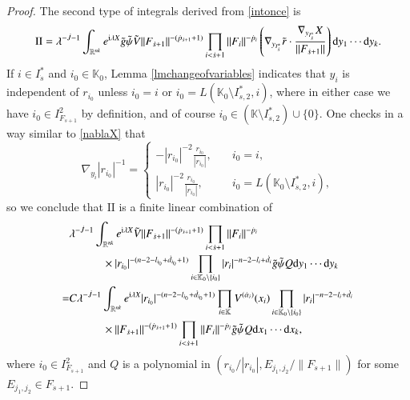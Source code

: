 \documentclass[11pt,reqno]{amsart}
\def\d{{\rm d}}
\numberwithin{equation}{section}
\theoremstyle{definition}
\begin{document}
\begin{proof}
	The second type of integrals derived from \eqref{intonce} is
	\begin{equation*}
		\mathrm{II}=\lambda^{-\dot{J}-1}\int_{\mathbb{R}^{nk}}e^{\mathrm{i}\lambda X}\tilde{g}\tilde{\psi}\tilde{V}\|F_{\dot{s}+1}\|^{-(\dot{p}_{\dot{s}+1}+1)}\prod_{i<\dot{s}+1}\|F_i\|^{-{\dot{p}_i}}\left(\nabla_{y_{I_{\dot{s}}^*}}\tilde{r}\cdot\frac{\nabla_{y_{I_{\dot{s}}^*}}X}{\|F_{\dot{s}+1}\|}\right)\d y_1\cdots \d y_k.
	\end{equation*}
	If $i\in I_{\dot{s}}^*$ and $i_0\in\mathbb{K}_0$, Lemma \ref{lmchangeofvariables} indicates that $y_i$ is independent of $r_{i_0}$ unless $i_0=i$ or $i_0=L(\mathbb{K}_0\setminus I_{\dot{s},2}^*,i)$, where in either case we have $i_0\in I_{F_{\dot{s}+1}}^2$ by definition, and of course $i_0\in(\mathbb{K}\setminus I_{\dot{s},2}^*)\cup\{0\}$. One checks in a way similar to \eqref{nablaX} that
	\begin{equation*}\label{nablar_j}
		\nabla_{y_i}|r_{i_0}|^{-1}=\begin{cases}
			-|r_{i_0}|^{-2}\frac{r_{i_0}}{|r_{i_0}|},\quad&i_0=i,\\
			|r_{i_0}|^{-2}\frac{r_{i_0}}{|r_{i_0}|},&i_0=L(\mathbb{K}_0\setminus I_{\dot{s},2}^*,i),
		\end{cases}
	\end{equation*}
	so we conclude that $\mathrm{II}$ is a finite linear combination of
	\begin{equation}\label{IIcom}
		\begin{split}
			&\lambda^{-\dot{J}-1}\int_{\mathbb{R}^{nk}}e^{\mathrm{i}\lambda X}\tilde{V}\|F_{\dot{s}+1}\|^{-(\dot{p}_{\dot{s}+1}+1)}\prod_{i<\dot{s}+1}\|F_i\|^{-{\dot{p}_i}}\\
			&\quad\quad\quad\times|r_{i_0}|^{-(n-2-l_{i_0}+\dot{d}_{i_0}+1)}\prod_{i\in\mathbb{K}_0\setminus\{i_0\}}|r_i|^{-n-2-l_i+\dot{d}_i}\tilde{g}\tilde{\psi}Q \d y_1\cdots \d y_k\\
			=&C\lambda^{-\dot{J}-1}\int_{\mathbb{R}^{nk}}e^{\mathrm{i}\lambda X}|r_{i_0}|^{-(n-2-l_{i_0}+\dot{d}_{i_0}+1)}\prod_{i\in\mathbb{K}}V^{(\dot{\alpha}_i)}(x_i)\prod_{i\in\mathbb{K}_0\setminus\{i_0\}}|r_i|^{-n-2-l_i+\dot{d}_i}\\
			&\quad\quad\quad\times\|F_{\dot{s}+1}\|^{-(\dot{p}_{\dot{s}+1}+1)}\prod_{i<\dot{s}+1}\|F_i\|^{-{\dot{p}_i}}\tilde{g}\tilde{\psi}Q \d x_1\cdots \d x_k,
		\end{split}
	\end{equation}
	where $i_0\in I_{F_{\dot{s}+1}}^2$ and $Q$ is a polynomial in $(r_{i_0}/|r_{i_0}|,E_{j_1,j_2}/\|F_{\dot{s}+1}\|)$ for some $E_{j_1,j_2}\in F_{\dot{s}+1}$.
	

\end{proof}
\end{document}
